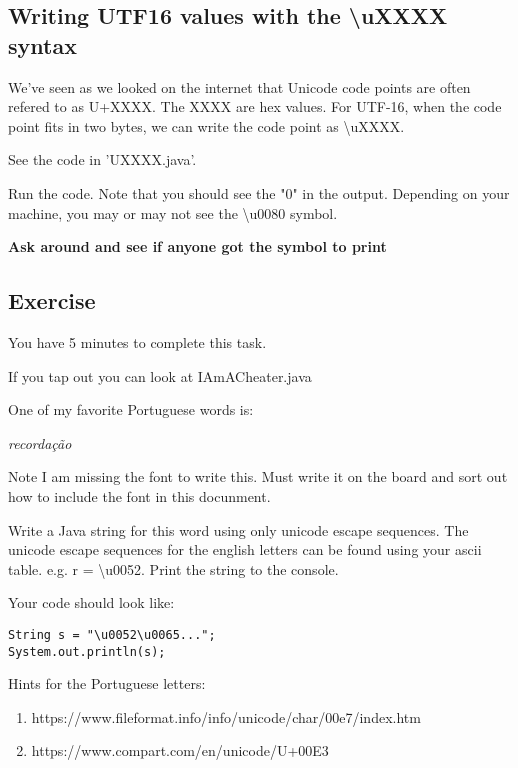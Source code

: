 \documentclass[12pt]{article}
\begin{document}
\subsection{Writing UTF16 values with the \textbackslash uXXXX syntax}
We've seen as we looked on the internet that Unicode code points are often refered to as U+XXXX. The XXXX are hex values. For UTF-16, when the code point fits in two bytes, we can write the code point as \textbackslash uXXXX.

See the code in 'UXXXX.java'.

Run the code. Note that you should see the "0" in the output. Depending on your machine, you may or may not see the \textbackslash u0080 symbol.

\begin{center}
\textbf{Ask around and see if anyone got the symbol to print}
\end{center}

\subsection{Exercise}

You have 5 minutes to complete this task. 

If you tap out you can look at IAmACheater.java

One of my favorite Portuguese words is:

\begin{center}
\textit{recordação} 
\end{center}

Note I am missing the font to write this. Must write it on the board and sort out how to include the font in this docunment.

Write a Java string for this word using only unicode escape sequences. The unicode escape sequences for the english letters can be found using your ascii table. e.g. r = \textbackslash u0052. Print the string to the console.

Your code should look like:

\begin{lstlisting}
String s = "\u0052\u0065...";
System.out.println(s);
\end{lstlisting}

Hints for the Portuguese letters:
\begin{enumerate}
\item https://www.fileformat.info/info/unicode/char/00e7/index.htm
\item https://www.compart.com/en/unicode/U+00E3
\end{enumerate}
\end{document}
